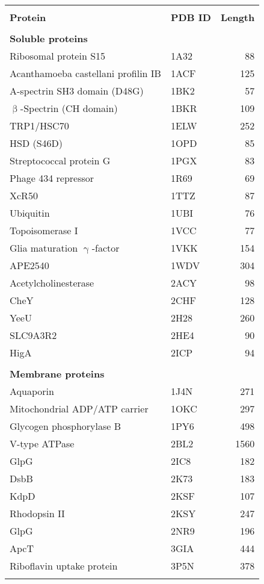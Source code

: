 

\begin{center}
\begin{tabular}{l l r}
\toprule \\
\textbf{Protein } & \textbf{PDB ID} & \textbf{Length} \\
\midrule \\
\multicolumn{3}{l}{\textbf{Soluble proteins}} \\
Ribosomal protein S15 & 1A32 &	88\\
Acanthamoeba castellani profilin IB & 1ACF &	125\\
A-spectrin SH3 domain (D48G) & 1BK2 &	57\\
$\mathrm{\upbeta}$-Spectrin (CH domain)& 1BKR &	109\\
TRP1/HSC70 & 1ELW &	252\\
HSD (S46D) & 1OPD &	85\\
Streptococcal protein G & 1PGX &	83\\
Phage 434 repressor & 1R69 &	69\\
XcR50 & 1TTZ &	87\\
Ubiquitin & 1UBI &	76\\
Topoisomerase I & 1VCC &	77\\
Glia maturation $\mathrm{\upgamma}$-factor & 1VKK &	154\\
APE2540 & 1WDV &	304\\
Acetylcholinesterase & 2ACY &	98\\
CheY & 2CHF &	128\\
YeeU & 2H28 &	260\\
SLC9A3R2 & 2HE4 &	90\\
HigA & 2ICP &	94 \\
\\
\multicolumn{3}{l}{\textbf{Membrane proteins}} \\
Aquaporin & 1J4N &	271\\
Mitochondrial ADP/ATP carrier & 1OKC &	297\\
Glycogen phosphorylase B & 1PY6 &	498\\
V-type ATPase & 2BL2 &	1560\\
GlpG & 2IC8 &	182\\
DsbB & 2K73 &	183\\
KdpD & 2KSF &	107\\
Rhodopsin II & 2KSY &	247\\
GlpG & 2NR9 &	196\\
ApcT & 3GIA &	444\\
Riboflavin uptake protein & 3P5N &	378\\
\bottomrule \\
\end{tabular} 
\end{center}
